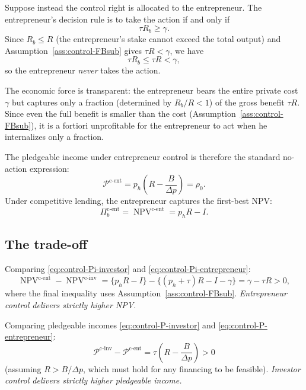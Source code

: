 \documentclass[11pt,a4paper,oneside]{book}
\def\leq{\leqslant}
\def\geq{\geqslant}
\DeclareMathOperator{\NPV}{NPV}
\theoremstyle{plain}
\theoremstyle{definition}
\theoremstyle{remark}
\numberwithin{equation}{chapter}
\begin{document}
Suppose instead the control right is allocated to the entrepreneur.
The entrepreneur's decision rule is to take the action if and only if
\begin{equation*}
  \tau R_b \geq \gamma.
\end{equation*}
Since $R_b \leq R$ (the entrepreneur's stake cannot exceed the total output) and Assumption~\ref{ass:control-FBsub} gives $\tau R < \gamma$, we have
\begin{equation*}
  \tau R_b \leq \tau R < \gamma,
\end{equation*}
so the entrepreneur \emph{never} takes the action.

The economic force is transparent: the entrepreneur bears the entire private cost $\gamma$ but captures only a fraction (determined by $R_b/R < 1$) of the gross benefit $\tau R$.
Since even the full benefit is smaller than the cost (Assumption~\ref{ass:control-FBsub}), it is a fortiori unprofitable for the entrepreneur to act when he internalizes only a fraction.

The pledgeable income under entrepreneur control is therefore the standard no-action expression:
\begin{equation}\label{eq:control-P-entrepreneur}
  \mathcal{P}^{\text{c-ent}} = p_h\left(R - \frac{B}{\Delta p}\right) = \rho_0.
\end{equation}
Under competitive lending, the entrepreneur captures the first-best NPV:
\begin{equation}\label{eq:control-Pi-entrepreneur}
  \Pi_b^{\text{c-ent}} = \NPV^{\text{c-ent}} = p_h R - I.
\end{equation}

\subsection{The trade-off}

Comparing \eqref{eq:control-Pi-investor} and \eqref{eq:control-Pi-entrepreneur}:
\begin{equation}\label{eq:control-NPV-diff}
  \NPV^{\text{c-ent}} - \NPV^{\text{c-inv}} = \bigl\{p_h R - I\bigr\} - \bigl\{(p_h + \tau) R - I - \gamma\bigr\} = \gamma - \tau R > 0,
\end{equation}
where the final inequality uses Assumption~\ref{ass:control-FBsub}.
\emph{Entrepreneur control delivers strictly higher NPV.}

Comparing pledgeable incomes \eqref{eq:control-P-investor} and \eqref{eq:control-P-entrepreneur}:
\begin{equation}\label{eq:control-P-diff}
  \mathcal{P}^{\text{c-inv}} - \mathcal{P}^{\text{c-ent}} = \tau\left(R - \frac{B}{\Delta p}\right) > 0
\end{equation}
(assuming $R > B/\Delta p$, which must hold for any financing to be feasible).
\emph{Investor control delivers strictly higher pledgeable income.}
\end{document}
